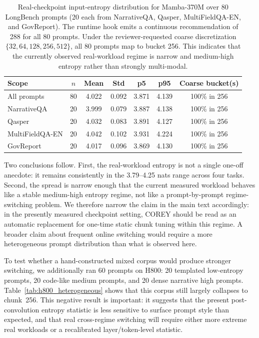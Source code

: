 \begin{table}[!t]
\centering
\caption{Real-checkpoint input-entropy distribution for Mamba-370M over 80 LongBench prompts (20 each from NarrativeQA, Qasper, MultiFieldQA-EN, and GovReport). The runtime hook emits a continuous recommendation of 288 for all 80 prompts. Under the reviewer-requested coarse discretization $\{32,64,128,256,512\}$, all 80 prompts map to bucket 256. This indicates that the currently observed real-workload regime is narrow and medium-high entropy rather than strongly multi-modal.}
\label{tab:entropy_variance_real}
\small
\begin{tabular}{lcccccc}
\toprule
Scope & $n$ & Mean & Std & p5 & p95 & Coarse bucket(s) \\
\midrule
All prompts & 80 & 4.022 & 0.092 & 3.871 & 4.139 & 100\% in 256 \\
NarrativeQA & 20 & 3.999 & 0.079 & 3.887 & 4.138 & 100\% in 256 \\
Qasper & 20 & 4.032 & 0.083 & 3.891 & 4.127 & 100\% in 256 \\
MultiFieldQA-EN & 20 & 4.042 & 0.102 & 3.931 & 4.224 & 100\% in 256 \\
GovReport & 20 & 4.017 & 0.096 & 3.869 & 4.130 & 100\% in 256 \\
\bottomrule
\end{tabular}
\end{table}

Two conclusions follow. First, the real-workload entropy is not a single one-off anecdote: it remains consistently in the 3.79--4.25 nats range across four tasks. Second, the spread is narrow enough that the current measured workload behaves like a stable medium-high entropy regime, not like a prompt-by-prompt regime-switching problem. We therefore narrow the claim in the main text accordingly: in the presently measured checkpoint setting, COREY should be read as an automatic replacement for one-time static chunk tuning within this regime. A broader claim about frequent online switching would require a more heterogeneous prompt distribution than what is observed here.

To test whether a hand-constructed mixed corpus would produce stronger switching, we additionally ran 60 prompts on H800: 20 templated low-entropy prompts, 20 code-like medium prompts, and 20 dense narrative high prompts. Table~\ref{tab:h800_heterogeneous} shows that this corpus still largely collapses to chunk~256. This negative result is important: it suggests that the present post-convolution entropy statistic is less sensitive to surface prompt style than expected, and that real cross-regime switching will require either more extreme real workloads or a recalibrated layer/token-level statistic.

